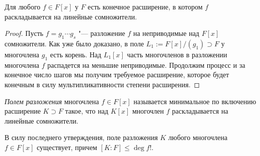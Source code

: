 \begin{proposition}
	Для любого $f \in F[x]$ у $F$ есть конечное расширение, в котором $f$ раскладывается на линейные сомножители.
\end{proposition}

\begin{proof}
	Пусть $f = g_1\dotsm g_s$ "--- разложение $f$ на неприводимые над $F[x]$ сомножители. Как уже было доказано, в поле $L_1 := F[x] / (g_1) \supset F$ у многочлена $g_1$ есть корень. Над $L_1[x]$ часть многочленов в разложении многочлена $f$ распадется на меньшие неприводимые. Продолжим процесс и за конечное число шагов мы получим требуемое расширение, которое будет конечным в силу мультипликативности степени расширения.
\end{proof}

\begin{definition}
	\textit{Полем разложения} многочлена $f \in F[x]$ называется минимальное по включению расширение $K \supset F$ такое, что над $K[x]$ многочлен $f$ раскладывается на линейные сомножители.
\end{definition}

\begin{note}
	В силу последнего утверждения, поле разложения $K$ любого многочлена $f \in F[x]$ существует, причем $[K : F] \le \deg{f}!$.
\end{note}

